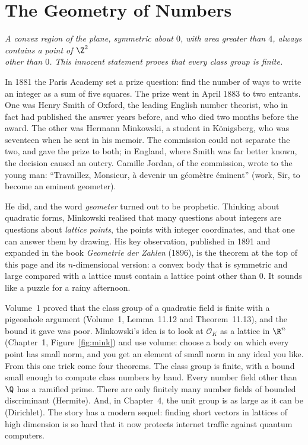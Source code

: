 \chapter{The Geometry of Numbers}
\begin{center}\itshape
A convex region of the plane, symmetric about $0$, with area greater than $4$, always contains a point of $\Z^2$\\
other than $0$. This innocent statement proves that every class group is finite.
\end{center}

In 1881 the Paris Academy set a prize question: find the number of ways to write an integer as a sum of five squares.
The prize went in April 1883 to two entrants. One was Henry Smith of Oxford, the leading English number theorist, who in fact
had published the answer years before, and who died two months before the award. The other was Hermann Minkowski, a
student in K\"onigsberg, who was seventeen when he sent in his memoir. The commission could not separate the two, and
gave the prize to both; in England, where Smith was far better known, the decision caused an outcry. Camille Jordan, of
the commission, wrote to the young man: ``Travaillez, Monsieur, \`a devenir un g\'eom\`etre \'eminent'' (work, Sir, to
become an eminent geometer).

He did, and the word \emph{geometer} turned out to be prophetic. Thinking about quadratic forms, Minkowski realised that
many questions about integers are questions about \emph{lattice points}, the points with integer coordinates, and that one
can answer them by drawing. His key observation, published in 1891 and expanded in the book \emph{Geometrie der Zahlen}
(1896), is the theorem at the top of this page and its $n$-dimensional version: a convex body that is symmetric and large
compared with a lattice must contain a lattice point other than $0$. It sounds like a puzzle for a rainy afternoon.

Volume~1 proved that the class group of a quadratic field is finite with a pigeonhole argument (Volume~1, Lemma~11.12 and
Theorem~11.13), and the bound it gave was poor. Minkowski's idea is to look at $\mathcal O_K$ as a lattice in $\R^n$
(Chapter~1, Figure~\ref{fig:mink}) and use volume: choose a body on which every point has small norm, and you get an
element of small norm in any ideal you like. From this one trick come four theorems. The class group is finite, with a
bound small enough to compute class numbers by hand. Every number field other than $\Q$ has a ramified prime. There are only
finitely many number fields of bounded discriminant (Hermite). And, in Chapter~4, the unit group is as large as it can be
(Dirichlet). The story has a modern sequel: finding short vectors in lattices of high dimension is so hard that it now
protects internet traffic against quantum computers.

